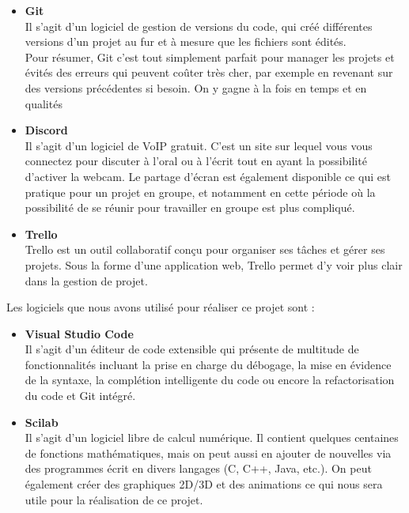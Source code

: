 \documentclass[french]{report}
\begin{document}
\begin{itemize}
\item  \textbf{Git} \\
Il s'agit d'un logiciel de gestion de versions du code, qui créé différentes versions d'un projet au fur et à mesure que les fichiers sont édités.\\
Pour résumer, Git c'est tout simplement parfait pour manager les projets et évités des erreurs qui peuvent coûter très cher, par exemple en revenant sur des versions précédentes si besoin. On y gagne à la fois en temps et en qualités
\item \textbf{Discord} \\
Il s'agit d'un logiciel de VoIP gratuit. C'est un site sur lequel vous vous connectez pour discuter à l'oral ou à l'écrit tout en ayant la possibilité d'activer la webcam. Le partage d'écran est également disponible ce qui est pratique pour un projet en groupe, et notamment en cette période où la possibilité de se réunir pour travailler en groupe est plus compliqué.
\item \textbf{Trello} \\
Trello est un outil collaboratif conçu pour organiser ses tâches et gérer ses projets. Sous la forme d'une application web, Trello permet d'y voir plus clair dans la gestion de projet. \newline
\end{itemize} 

Les logiciels que nous avons utilisé pour réaliser ce projet sont :
\begin{itemize}
\item  \textbf{Visual Studio Code} \\
Il s'agit d'un éditeur de code extensible qui présente de multitude de fonctionnalités incluant la prise en charge du débogage, la mise en évidence de la syntaxe, la complétion intelligente du code ou encore  la refactorisation du code et Git intégré. 
\item \textbf{Scilab} \\
Il s'agit d'un logiciel libre de calcul numérique. Il contient quelques centaines de fonctions mathématiques, mais on peut aussi en ajouter de nouvelles via des programmes écrit en divers langages (C, C++, Java, etc.). On peut également créer des graphiques 2D/3D et des animations ce qui nous sera utile pour la réalisation de ce projet.\\\\

\end{itemize}
\end{document}
